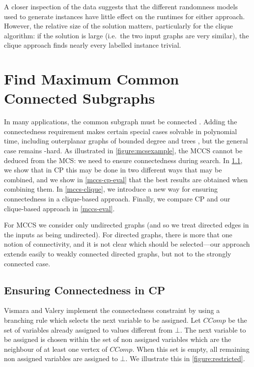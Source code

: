 \documentclass{llncs}
\begin{document}
A closer inspection of the data suggests that the different randomness models used to generate
instances have little effect on the runtimes for either approach. However, the relative size of the
solution matters, particularly for the clique algorithm: if the solution is large (i.e.\ the two
input graphs are very similar), the clique approach finds nearly every labelled instance trivial.

\section{Find Maximum Common Connected Subgraphs}\label{mccs}

In many applications, the common subgraph must be connected
\cite{DBLP:journals/tcs/Koch01,DBLP:journals/jcamd/RaymondW02a,DBLP:conf/mco/VismaraV08,Ehrlich:2011}.
Adding the connectedness requirement makes certain special cases solvable in polynomial time,
including outerplanar graphs of bounded degree \cite{DBLP:journals/algorithms/AkutsuT13} and trees
\cite{DBLP:journals/corr/DroschinskyKM16}, but the general case remains \NP-hard. As illustrated in
\cref{figure:mcsexample}, the MCCS cannot be deduced from the MCS: we need to ensure connectedness
during search. In \cref{mccs-cp}, we show that in CP this may be done in two different ways that
may be combined, and we show in \cref{mccs-cp-eval} that the best results are obtained when
combining them. In \cref{mccs-clique}, we introduce a new way for ensuring connectedness in a
clique-based approach. Finally, we compare CP and our clique-based approach in \cref{mccs-eval}.

For MCCS we consider only undirected graphs (and so we treat directed edges in the inputs as being
undirected). For directed graphs, there is more that one notion of connectivity, and it is not clear
which should be selected---our approach extends easily to weakly connected directed graphs, but not
to the strongly connected case.

\subsection{Ensuring Connectedness in CP}\label{mccs-cp}

Vismara and Valery \cite{DBLP:conf/mco/VismaraV08} implement the connectedness constraint by using a
branching rule which selects the next variable to be assigned. Let $\mathit{CComp}$ be the
set of variables already assigned to values different from $\bot$. The next variable to be assigned
is chosen within the set of non assigned variables which are the neighbour of at least one vertex of
$\mathit{CComp}$.  When this set is empty, all remaining non assigned variables are assigned to
$\bot$. We illustrate this in \cref{figure:restricted}.
\end{document}
